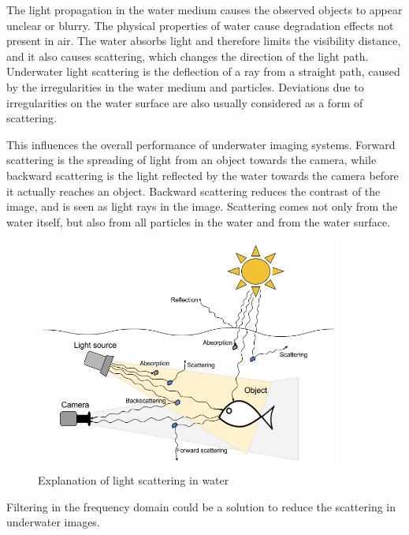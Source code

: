 The light propagation in the water medium causes the observed objects to appear unclear or blurry. The physical properties of water cause degradation effects not present in air. The water absorbs light and therefore limits the visibility distance, and it also causes scattering, which changes the direction of the light path. Underwater light scattering is the deflection of a ray from a straight path, caused by the irregularities in the water medium and particles. Deviations due to irregularities on the water surface are also usually considered as a form of scattering. 

This influences the overall performance of underwater imaging systems. Forward scattering is the spreading of light from an object towards the camera, while backward scattering is the light reflected by the water towards the camera before it actually reaches an object. Backward scattering reduces the contrast of the image, and is seen as light rays in the image. Scattering comes not only from the water itself, but also from all particles in the water and from the water surface.\cite{article:underwater_image_processing}

\begin{figure}[h]
    \centering
    \includegraphics[width=0.9\textwidth]{images/literature/light_scattering}
    \caption{Explanation of light scattering in water}
    \label{fig:light_scattering}
\end{figure}

Filtering in the frequency domain could be a solution to reduce the scattering in underwater images.




